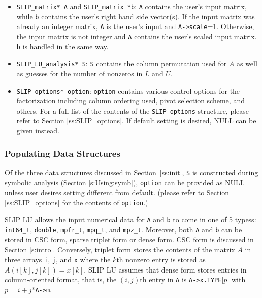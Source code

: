 \documentclass[12pt]{article}
\theoremstyle{definition}
\begin{document}
\begin{itemize}
\item \verb|SLIP_matrix* A| and \verb|SLIP_matrix *b|:
\verb|A| contains the user's input matrix, while \verb|b| contains the user's
right hand side vector(s). If the input matrix was already an integer matrix,
\verb|A| is the user's input and \verb|A->scale|=1. Otherwise, the input matrix is not integer and \verb|A| contains the user's scaled input matrix. \verb|b|
is handled in the same way.

\item \verb|SLIP_LU_analysis* S|: \verb|S| contains the column permutation used
for $A$ as well as guesses for the number of nonzeros in $L$ and $U$.

\item \verb|SLIP_options* option|: \verb|option| contains various control
options for the factorization including column ordering used, pivot selection
scheme, and others. For a full list of the contents of the \verb|SLIP_options|
structure, please refer to Section \ref{ss:SLIP_options}. If default setting
is desired, NULL can be given instead.

\end{itemize}

\subsubsection{Populating Data Structures}

Of the three data structures discussed in Section~\ref{ss:init}, \verb|S| is
constructed during symbolic analysis (Section \ref{s:Using:symb}), \verb|option|
can be provided as NULL unless user desires setting different from default.
(please refer to Section \ref{ss:SLIP_options} for the contents of
\verb|option|.)

SLIP LU allows the input numerical data for \verb|A| and \verb|b| to come in
one of 5 typess: \verb|int64_t|, \verb|double|, \verb|mpfr_t|, \verb|mpq_t|,
and \verb|mpz_t|. Moreover, both \verb|A| and \verb|b| can be stored in
CSC form, sparse triplet form or dense form. CSC form is discussed in Section
\ref{s:intro}. Conversely, triplet form stores the contents of the matrix $A$
in three arrays \verb|i|, \verb|j|, and \verb|x| where the $k$th nonzero entry
is stored as $A ( i[k], j[k]) = x[k]$. SLIP LU assumes that dense form stores
entries in column-oriented format, that is, the $(i,j)$th entry in \verb|A|
is \verb|A->x.TYPE|[$p$] with $p = i+j$*\verb|A->m|.
\end{document}
